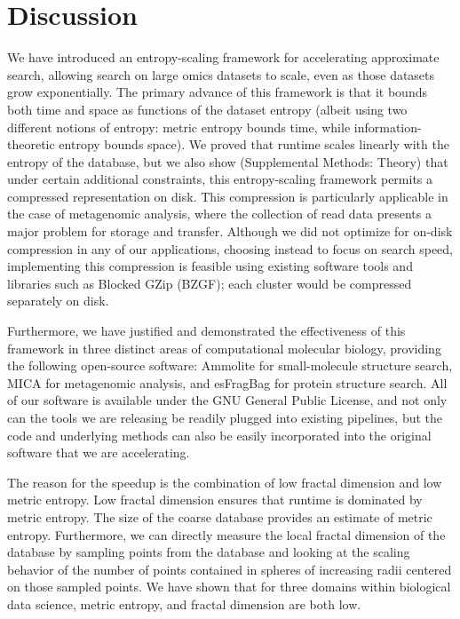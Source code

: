 \documentclass[review,preprint,12pt]{elsarticle}
\theoremstyle{definition}
\theoremstyle{remark}
\numberwithin{equation}{section}
\begin{document}
\section{Discussion}

We have introduced an entropy-scaling framework for accelerating approximate search, allowing search on large omics datasets to scale, even as those datasets grow exponentially.
The primary advance of this framework is that it bounds both time and space as functions of the dataset entropy (albeit using two different notions of entropy: metric entropy bounds time, while information-theoretic entropy bounds space).
We proved that runtime scales linearly with the entropy of the database, but we also show (Supplemental Methods: Theory) that under certain additional constraints, this entropy-scaling framework permits a compressed representation on disk.
This compression is particularly applicable in the case of metagenomic analysis, where the collection of read data presents a major problem for storage and transfer.
Although we did not optimize for on-disk compression in any of our applications, choosing instead to focus on search speed, implementing this compression is feasible using existing software tools and libraries such as Blocked GZip (BZGF); each cluster would be compressed separately on disk.

Furthermore, we have justified and demonstrated the effectiveness of this 
framework in
three distinct areas of computational molecular biology, providing the
following open-source software: Ammolite for
small-molecule structure search, MICA for metagenomic analysis, and esFragBag for protein structure search.
All of our software is available under the GNU General Public License, and not only can the tools we are 
releasing be readily plugged into existing pipelines, but the code and 
underlying methods can also be easily incorporated into the original 
software that we are accelerating.

The reason for the speedup is the combination of low fractal dimension and low metric entropy.
Low fractal dimension ensures that runtime is dominated by metric entropy.
The size of the coarse database provides an estimate of metric entropy.
Furthermore, we can directly measure the local fractal dimension of the database by sampling points from the database and looking at the scaling behavior of the number of points contained in spheres of increasing radii centered on those sampled points.
We have shown that for three domains within biological data science, metric entropy, and fractal dimension are both low.
\end{document}
